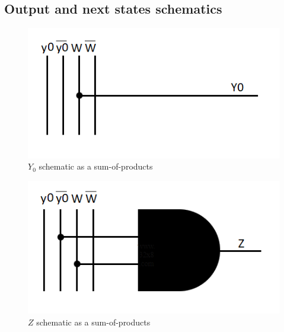 \documentclass[../../e3_tp3_main.tex]{subfiles}
\begin{document}
\subsection{Output and next states schematics}
\begin{figure}[H]
	\centering
	\includegraphics{figures/ej3_Y0_schem_mealy.PNG}
	\caption{$Y_0$ schematic as a sum-of-products}
\end{figure}
\begin{figure}[H]
	\centering
	\includegraphics{figures/ej3_Z_schem_mealy.PNG}
	\caption{$Z$ schematic as a sum-of-products}
\end{figure}
\end{document}

